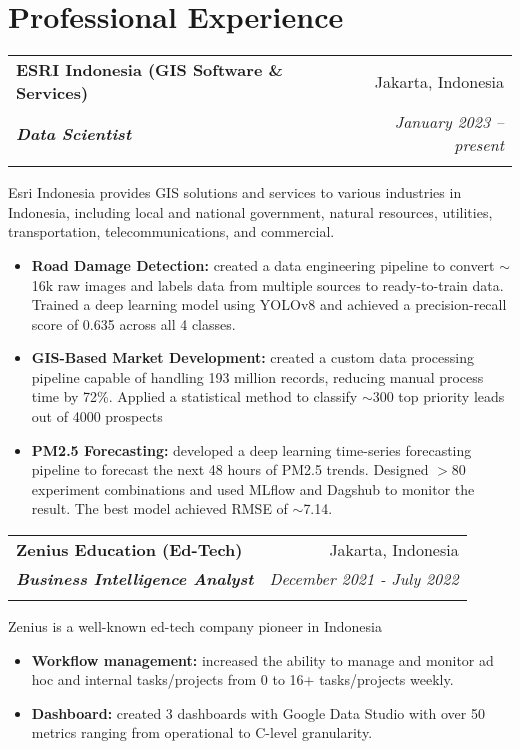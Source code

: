 \documentclass[a4paper, 11pt]{article}
\makeatletter
\newcommand{\resumeItem}[2]{
    \item\small{
        \textbf{#1}{#2 \vspace{-2pt}}
    }
}
\newcommand{\resumeSubheading}[4]{
    \vspace{-1pt}
    \begin{tabular*}{\textwidth}{l@{\extracolsep{\fill}}r}
        \color{lightblue}\textbf{#1} & #2 \\
        \textbf{\textit{\small#3}} & \textit{\small #4} \\
        \textnormal{}\vspace{-5pt}
    \end{tabular*}\vspace{-5pt}
}
\newcommand{\resumeItemListStart}{\begin{itemize}[leftmargin=*]\setlength\itemsep{0em}\vspace{-1pt}}
\newcommand{\resumeItemListEnd}{\end{itemize}\vspace{-5pt}}
\makeatother
\begin{document}
    \section{Professional Experience}
    \resumeSubheading
    {ESRI Indonesia (GIS Software \& Services)}{Jakarta, Indonesia}
    {Data Scientist}{January 2023 – present}
    \small{Esri Indonesia provides GIS solutions and services to various industries in 
    Indonesia, including local and national government, natural resources, utilities, 
    transportation, telecommunications, and commercial.}
    \vspace{-1pt}
    \resumeItemListStart
    \resumeItem{Road Damage Detection:}{ created a data engineering pipeline to convert $\sim$16k raw images and labels data from multiple sources to ready-to-train data. Trained a deep learning model using YOLOv8 and achieved a precision-recall score of 0.635 across all 4 classes.}
    \resumeItem{GIS-Based Market Development:}{ created a custom data processing pipeline capable of handling 193 million records, reducing manual process time by 72\%. Applied a statistical method to classify $\sim$300 top priority leads out of 4000 prospects
    }
    \resumeItem{PM2.5 Forecasting:}{ developed a deep learning time-series forecasting pipeline to forecast the next 48 hours of PM2.5 trends. Designed $>$80 experiment combinations and used MLflow and Dagshub to monitor the result. The best model achieved RMSE of $\sim$7.14.
    }
    \resumeItemListEnd

    \vspace{5pt}
    \resumeSubheading
    {Zenius Education (Ed-Tech)}
    {Jakarta, Indonesia}
    {Business Intelligence Analyst}
    {December 2021 - July 2022}
    \small{Zenius is a well-known ed-tech company pioneer in Indonesia}
    \vspace{-1pt}
    \resumeItemListStart
    \resumeItem{Workflow management:}{ increased the ability to manage and monitor ad hoc and internal tasks/projects from 0 to 
    16+ tasks/projects weekly.}
    \resumeItem{Dashboard:}{ created 3 dashboards with Google Data Studio with over 50 metrics ranging from operational to C-level granularity.}
    \resumeItemListEnd
\end{document}
